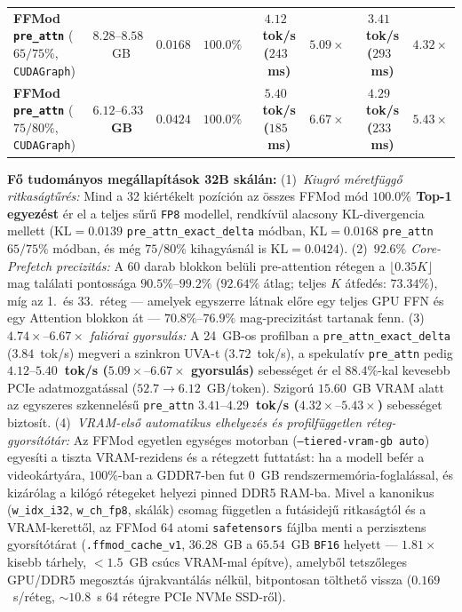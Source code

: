 \documentclass[10pt,twocolumn]{article}
\begin{document}
\begin{table}[t]
{\begin{tabular}{lccccccc}
    \textbf{FFMod \texttt{pre\_attn}} ($65/75\%$, \texttt{CUDAGraph}) & $8.28\text{--}8.58$~GB & \textbf{$0.0168$} & \textbf{$100.0\%$} & \textbf{$4.12$~tok/s ($243$~ms)} & \textbf{$5.09\times$} & \textbf{$3.41$~tok/s ($293$~ms)} & \textbf{$4.32\times$} \\
    \textbf{FFMod \texttt{pre\_attn}} ($75/80\%$, \texttt{CUDAGraph}) & \textbf{$6.12\text{--}6.33$~GB} & \textbf{$0.0424$} & \textbf{$100.0\%$} & \textbf{$5.40$~tok/s ($185$~ms)} & \textbf{$6.67\times$} & \textbf{$4.29$~tok/s ($233$~ms)} & \textbf{$5.43\times$} \\
    \bottomrule
  \end{tabular}%
  }
\end{table}

\textbf{Fő tudományos megállapítások 32B skálán:}
(1)~\emph{Kiugró méretfüggő ritkaságtűrés:} Mind a 32 kiértékelt pozíción az összes FFMod mód \textbf{$100.0\%$ Top-1 egyezést} ér el a teljes sűrű \texttt{FP8} modellel, rendkívül alacsony KL-divergencia mellett ($\mathrm{KL}=0.0139$ \texttt{pre\_attn\_exact\_delta} módban, $\mathrm{KL}=0.0168$ \texttt{pre\_attn} $65/75\%$ módban, és még $75/80\%$ kihagyásnál is $\mathrm{KL}=0.0424$).
(2)~\emph{$92.6\%$ Core-Prefetch precizitás:} A 60 darab blokkon belüli pre-attention rétegen a $\lfloor 0.35 K\rfloor$ mag találati pontossága $90.5\%\text{--}99.2\%$ ($92.64\%$ átlag; teljes $K$ átfedés: $73.34\%$), míg az 1.\ és 33.\ réteg --- amelyek egyszerre látnak előre egy teljes GPU FFN és egy Attention blokkon át --- $70.8\%\text{--}76.9\%$ mag-precizitást tartanak fenn.
(3)~\emph{$4.74\times\text{--}6.67\times$ faliórai gyorsulás:} A 24~GB-os profilban a \texttt{pre\_attn\_exact\_delta} ($3.84$~tok/s) megveri a szinkron UVA-t ($3.72$~tok/s), a spekulatív \texttt{pre\_attn} pedig \textbf{$4.12\text{--}5.40$~tok/s ($5.09\times\text{--}6.67\times$ gyorsulás)} sebességet ér el $88.4\%$-kal kevesebb PCIe adatmozgatással ($52.7\to 6.12$~GB/token). Szigorú $15.60$~GB VRAM alatt az egyszeres szkennelésű \texttt{pre\_attn} \textbf{$3.41\text{--}4.29$~tok/s ($4.32\times\text{--}5.43\times$)} sebességet biztosít.
(4)~\emph{VRAM-első automatikus elhelyezés és profilfüggetlen réteg-gyorsítótár:} Az FFMod egyetlen egységes motorban (\texttt{--tiered-vram-gb auto}) egyesíti a tiszta VRAM-rezidens és a rétegzett futtatást: ha a modell befér a videokártyára, $100\%$-ban a GDDR7-ben fut $0$~GB rendszermemória-foglalással, és kizárólag a kilógó rétegeket helyezi pinned DDR5 RAM-ba. Mivel a kanonikus (\texttt{w\_idx\_i32}, \texttt{w\_ch\_fp8}, skálák) csomag független a futásidejű ritkaságtól és a VRAM-kerettől, az FFMod 64 atomi \texttt{safetensors} fájlba menti a perzisztens gyorsítótárat (\texttt{.ffmod\_cache\_v1}, $36.28$~GB a $65.54$~GB \texttt{BF16} helyett --- $1.81\times$ kisebb tárhely, $<1.5$~GB csúcs VRAM-mal építve), amelyből tetszőleges GPU/DDR5 megosztás újrakvantálás nélkül, bitpontosan tölthető vissza ($0.169$~s/réteg, $\sim 10.8$~s 64 rétegre PCIe NVMe SSD-ről).
\end{document}
